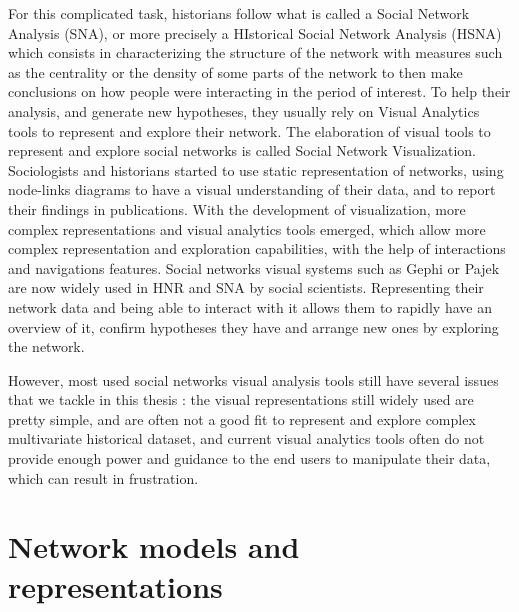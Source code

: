 For this complicated task, historians follow what is called a Social Network Analysis (SNA), or more precisely a HIstorical Social Network Analysis (HSNA) which consists in characterizing the structure of the network with measures such as the centrality or the density of some parts of the network to then make conclusions on how people were interacting in the period of interest. To help their analysis, and generate new hypotheses, they usually rely on Visual Analytics tools to represent and explore their network. The elaboration of visual tools to represent and explore social networks is called Social Network Visualization.
Sociologists and historians started to use static representation of networks, using node-links diagrams to have a visual understanding of their data, and to report their findings in publications. With the development of visualization, more complex representations and visual analytics tools emerged, which allow more complex representation and exploration capabilities, with the help of interactions and navigations features. Social networks visual systems such as Gephi or Pajek are now widely used in HNR and SNA by social scientists. Representing their network data and being able to interact with it allows them to rapidly have an overview of it, confirm hypotheses they have and arrange new ones by exploring the network.

However, most used social networks visual analysis tools still have several issues that we tackle in this thesis : the visual representations still widely used are pretty simple, and are often not a good fit to represent and explore complex multivariate historical dataset, and current visual analytics tools often do not provide enough power and guidance to the end users to manipulate their data, which can result in frustration.

\section{Network models and representations}

